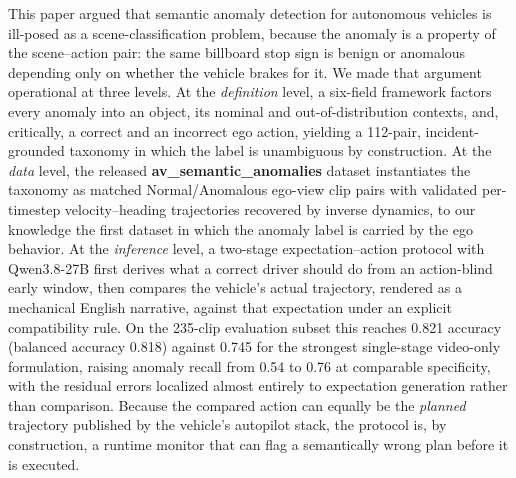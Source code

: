 \documentclass[conference]{IEEEtran}
\begin{document}
This paper argued that semantic anomaly detection for autonomous vehicles is ill-posed as a scene-classification problem, because the anomaly is a property of the scene--action pair: the same billboard stop sign is benign or anomalous depending only on whether the vehicle brakes for it. We made that argument operational at three levels. At the \emph{definition} level, a six-field framework factors every anomaly into an object, its nominal and out-of-distribution contexts, and, critically, a correct and an incorrect ego action, yielding a 112-pair, incident-grounded taxonomy in which the label is unambiguous by construction. At the \emph{data} level, the released \textbf{av\_semantic\_anomalies} dataset instantiates the taxonomy as matched Normal/Anomalous ego-view clip pairs with validated per-timestep velocity--heading trajectories recovered by inverse dynamics, to our knowledge the first dataset in which the anomaly label is carried by the ego behavior. At the \emph{inference} level, a two-stage expectation--action protocol with Qwen3.8-27B first derives what a correct driver should do from an action-blind early window, then compares the vehicle's actual trajectory, rendered as a mechanical English narrative, against that expectation under an explicit compatibility rule. On the 235-clip evaluation subset this reaches 0.821 accuracy (balanced accuracy 0.818) against 0.745 for the strongest single-stage video-only formulation, raising anomaly recall from 0.54 to 0.76 at comparable specificity, with the residual errors localized almost entirely to expectation generation rather than comparison. Because the compared action can equally be the \emph{planned} trajectory published by the vehicle's autopilot stack, the protocol is, by construction, a runtime monitor that can flag a semantically wrong plan before it is executed.
\end{document}
